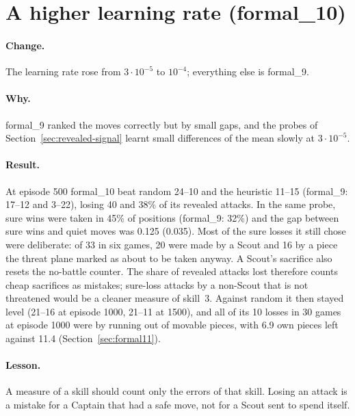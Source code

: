 \section{A higher learning rate (formal\_10)}
\label{sec:formal10}

\paragraph{Change.} The learning rate rose from $3\cdot10^{-5}$ to $10^{-4}$; everything else is
formal\_9.

\paragraph{Why.} formal\_9 ranked the moves correctly but by small gaps, and the probes of
Section~\ref{sec:revealed-signal} learnt small differences of the mean slowly at
$3\cdot10^{-5}$.

\paragraph{Result.} At episode 500 formal\_10 beat random 24--10 and the heuristic 11--15 (formal\_9:
17--12 and 3--22), losing 40 and 38\% of its revealed attacks. In the same probe, sure wins were taken
in 45\% of positions (formal\_9: 32\%) and the gap between sure wins and quiet moves was 0.125
(0.035). Most of the sure losses it still chose were deliberate: of 33 in six games, 20 were made
by a Scout and 16 by a piece the threat plane marked as about to be taken anyway. A Scout's
sacrifice also resets the no-battle counter. The share of revealed attacks lost therefore counts
cheap sacrifices as mistakes; sure-loss attacks by a non-Scout that is not threatened would be a
cleaner measure of skill~3. Against random it then stayed level (21--16 at episode 1000, 21--11 at
1500), and all of its 10 losses in 30 games at episode 1000 were by running out of movable pieces,
with 6.9 own pieces left against 11.4 (Section~\ref{sec:formal11}).

\paragraph{Lesson.} A measure of a skill should count only the errors of that skill. Losing an
attack is a mistake for a Captain that had a safe move, not for a Scout sent to spend itself.

